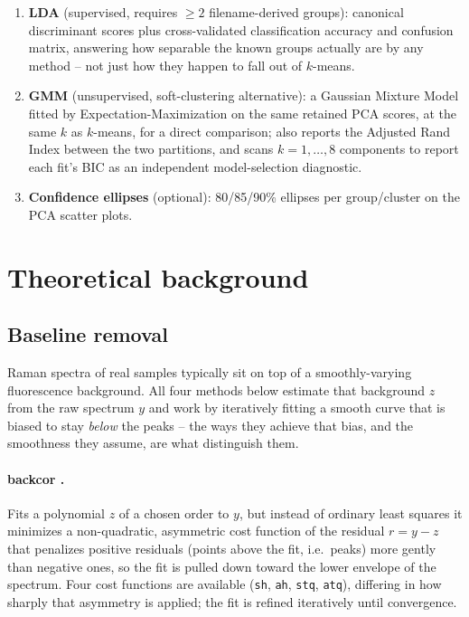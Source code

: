 \documentclass[11pt,a4paper]{article}
\newcommand{\code}[1]{\texttt{#1}}
\begin{document}
\begin{enumerate}
  \item \textbf{LDA} (supervised, requires $\geq 2$ filename-derived groups):
  canonical discriminant scores plus cross-validated classification accuracy
  and confusion matrix, answering how separable the known groups actually
  are by any method -- not just how they happen to fall out of $k$-means.
  \item \textbf{GMM} (unsupervised, soft-clustering alternative): a Gaussian
  Mixture Model fitted by Expectation-Maximization on the same retained PCA
  scores, at the same $k$ as $k$-means, for a direct comparison; also
  reports the Adjusted Rand Index between the two partitions, and scans
  $k=1,\dots,8$ components to report each fit's BIC as an independent
  model-selection diagnostic.
  \item \textbf{Confidence ellipses} (optional): 80/85/90\% ellipses per
  group/cluster on the PCA scatter plots.
\end{enumerate}

\newpage
\section{Theoretical background}

\subsection{Baseline removal}
\label{sec:baseline}
Raman spectra of real samples typically sit on top of a smoothly-varying
fluorescence background. All four methods below estimate that background
$z$ from the raw spectrum $y$ and work by iteratively fitting a smooth curve
that is biased to stay \emph{below} the peaks -- the ways they achieve that
bias, and the smoothness they assume, are what distinguish them.

\paragraph{backcor \cite{Mazet2005}.} Fits a polynomial $z$ of a chosen
order to $y$, but instead of ordinary least squares it minimizes a
non-quadratic, asymmetric cost function of the residual $r = y - z$ that
penalizes positive residuals (points above the fit, i.e.\ peaks) more gently
than negative ones, so the fit is pulled down toward the lower envelope of
the spectrum. Four cost functions are available (\code{sh}, \code{ah},
\code{stq}, \code{atq}), differing in how sharply that asymmetry is applied;
the fit is refined iteratively until convergence.
\end{document}
